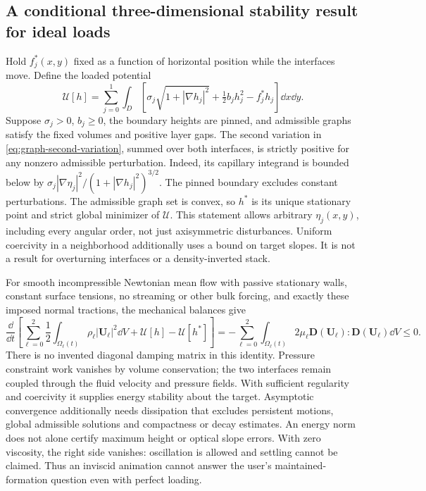 \subsection{A conditional three-dimensional stability result for ideal loads}
Hold $f_j^*(x,y)$ fixed as a function of horizontal position while the
interfaces move. Define the loaded potential
\begin{equation}
 \mathcal U[h]=\sum_{j=0}^1\int_D\left[
  \sigma_j\sqrt{1+|\nabla h_j|^2}+\tfrac12 b_jh_j^2-f_j^*h_j
 \right]\dd x\dd y.
 \label{eq:ideal-loaded-potential}
\end{equation}
Suppose $\sigma_j>0$, $b_j\geq0$, the boundary heights are pinned, and
admissible graphs satisfy the fixed volumes and positive layer gaps.
The second variation in \cref{eq:graph-second-variation}, summed over both
interfaces, is strictly positive for any nonzero admissible perturbation.
Indeed, its capillary integrand is bounded below by
$\sigma_j|\nabla\eta_j|^2/(1+|\nabla h_j|^2)^{3/2}$.
The pinned boundary excludes constant perturbations. The admissible graph
set is convex, so $h^*$ is its unique stationary point and strict global
minimizer of $\mathcal U$. This statement allows arbitrary $\eta_j(x,y)$,
including every angular order, not just axisymmetric disturbances. Uniform
coercivity in a neighborhood additionally uses a bound on target slopes.
It is not a result for overturning interfaces or a density-inverted stack.

For smooth incompressible Newtonian mean flow with passive stationary walls,
constant surface tensions, no streaming or other bulk forcing, and exactly
these imposed normal tractions, the mechanical balances give
\begin{equation}
 \frac{\dd}{\dd t}\left[
  \sum_{\ell=0}^2\frac12\int_{\Omega_\ell(t)}\rho_\ell|\bm U_\ell|^2\dd V
  +\mathcal U[h]-\mathcal U[h^*]\right]
 =-\sum_{\ell=0}^2\int_{\Omega_\ell(t)}2\mu_\ell
       \bm D(\bm U_\ell):\bm D(\bm U_\ell)\dd V\leq0.
 \label{eq:ideal-load-energy}
\end{equation}
There is no invented diagonal damping matrix in this identity. Pressure
constraint work vanishes by volume conservation; the two interfaces remain
coupled through the fluid velocity and pressure fields. With sufficient
regularity and coercivity it supplies energy stability about the target.
Asymptotic convergence additionally needs dissipation that excludes persistent
motions, global admissible solutions and compactness or decay estimates.
An energy norm does not alone certify maximum height or optical slope errors.
With zero viscosity, the right side vanishes: oscillation is allowed and
settling cannot be claimed. Thus an inviscid animation cannot answer the
user's maintained-formation question even with perfect loading.

